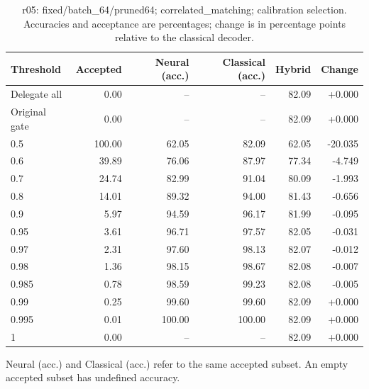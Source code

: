 \begin{table}[htbp]
\centering\small
\setlength{\tabcolsep}{3pt}
\caption{r05: fixed/batch\_64/pruned64; correlated\_matching; calibration selection. Accuracies and acceptance are percentages; change is in percentage points relative to the classical decoder.}
\begin{tabular}{lrrrrr}
\toprule
Threshold & Accepted & Neural (acc.) & Classical (acc.) & Hybrid & Change \\
\midrule
Delegate all & 0.00 & -- & -- & 82.09 & +0.000 \\
Original gate & 0.00 & -- & -- & 82.09 & +0.000 \\
0.5 & 100.00 & 62.05 & 82.09 & 62.05 & -20.035 \\
0.6 & 39.89 & 76.06 & 87.97 & 77.34 & -4.749 \\
0.7 & 24.74 & 82.99 & 91.04 & 80.09 & -1.993 \\
0.8 & 14.01 & 89.32 & 94.00 & 81.43 & -0.656 \\
0.9 & 5.97 & 94.59 & 96.17 & 81.99 & -0.095 \\
0.95 & 3.61 & 96.71 & 97.57 & 82.05 & -0.031 \\
0.97 & 2.31 & 97.60 & 98.13 & 82.07 & -0.012 \\
0.98 & 1.36 & 98.15 & 98.67 & 82.08 & -0.007 \\
0.985 & 0.78 & 98.59 & 99.23 & 82.08 & -0.005 \\
0.99 & 0.25 & 99.60 & 99.60 & 82.09 & +0.000 \\
0.995 & 0.01 & 100.00 & 100.00 & 82.09 & +0.000 \\
1 & 0.00 & -- & -- & 82.09 & +0.000 \\
\bottomrule
\end{tabular}
\par\smallskip\footnotesize Neural (acc.) and Classical (acc.) refer to the same accepted subset. An empty accepted subset has undefined accuracy.
\end{table}
